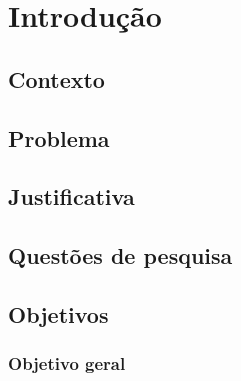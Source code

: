 \chapter{Introdução}
\label{chap:introducao}


\section{Contexto}
\label{sec:introducao-contexto}

\section{Problema}
\label{sec:introducao-problema}

\section{Justificativa}
\label{sec:introducao-justificativa}

\section{Questões de pesquisa}
\label{sec:introducao-questoes-de-pesquisa}

\section{Objetivos}
\label{sec:introducao-objetivos}

\subsection{Objetivo geral}
\label{subsec:introducao-objetivo-geral}

